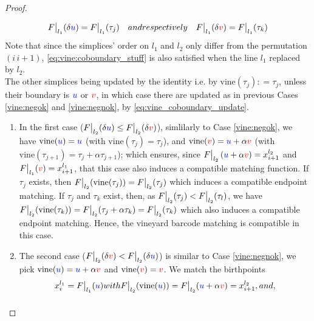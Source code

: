 \documentclass{article}
\newcommand{\vine}{\mathrm{vine}}
\newcommand\restr[2]{{  \left.\kern-\nulldelimiterspace #1 \vphantom{\big|} \right|_{#2}  }}
\begin{document}
\begin{proof}
\begin{enumerate}
\begin{enumerate}
					\begin{equation}\label{eq:vine:coboundary_stuff}
						\restr F {l_1}(\delta\u) = \restr F {l_1} (\tau_j)
						\quad
						\textnormal{ and respectively }
						\quad
						\restr F {l_1}(\delta\v) = \restr F {l_1} (\tau_k)
					\end{equation}
					Note that since the simplices' order on $l_1$ and $l_2$
					only differ from the permutation $(i\, i+1)$,
					\cref{eq:vine:coboundary_stuff} is also satisfied when the line
					$l_1$ replaced by $l_2$.
					\\
					The other simplices being updated by the identity
					i.e. by $\vine(\tau_j): = \tau_j$, unless their boundary
					is ${\color{blue} u}$ or ${\color{red} v}$, in which case there are updated as in
					previous Cases \ref{vine:negok} and \ref{vine:negnok}, by
					\cref{eq:vine_coboundary_update}.
					\begin{enumerate}
						\item In the first case ($\restr F {l_2}(\delta \u) \le \restr F {l_2}(\delta\v)$), simlilarly to Case \ref{vine:negok}, we have
							$\vine(\u) = \u$ (with $\vine(\tau_j) =\tau_j$), and $\vine(\v) = \u + \alpha \v$ (with $\vine(\tau_{j+1}) = \tau_j + \alpha\tau_{j+1}$); which ensures,
							since $\restr F {l_2} \left( \u + \alpha\v \right) = x_{i+1}^{l_2}$ and  $\restr F {l_1}(\v) = x_{i+1}^{l_1}$,
							that this case also induces a compatible matching function.
							If $\tau_j$ exists, then $\restr F {l_2}(\vine
							(\tau_j)) = \restr F {l_2} (\tau_j)$ which induces a
							compatible endpoint matching.
							If $\tau_j$ and $\tau_k$ exist, then, as $\restr F
							{l_2} (\tau_j) < \restr F {l_2} (\tau_l)$, we
							have $\restr F {l_2} (\vine(\tau_k))  = \restr F {l_2}(\tau_j + \alpha\tau_k) = \restr F {l_2} (\tau_k)$ which also induces a compatible endpoint matching.
							Hence, the vineyard barcode matching is compatible in this case.
						\item The second case ($\restr F {l_2}(\delta \v) < \restr F {l_2}(\delta\u)$) is similar to Case \ref{vine:negnok}, we pick
							$\vine(\u) = \u + \alpha\v$ and $\vine(\v) = \v$.
							We match the birthpoints
							\begin{equation*}
								x_i^{l_1} = \restr F {l_1} (\u) \textnormal{ with }
								\restr F {l_2}(\vine(\u)) =
								\restr F {l_2}(\u + \alpha\v )  					                  = x_{i+1}^{l_2},
								\textnormal{ and,}
							\end{equation*}
							\begin{equation*}

\end{equation*}
\end{enumerate}
\end{enumerate}
\end{enumerate}
\end{proof}
\end{document}
